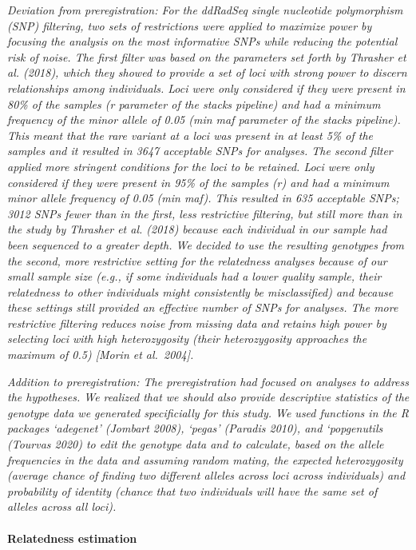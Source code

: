 \documentclass[]{article}
\let\oldparagraph\paragraph
\renewcommand{\paragraph}[1]{\oldparagraph{#1}\mbox{}}
\begin{document}
\emph{Deviation from preregistration: For the ddRadSeq single nucleotide
polymorphism (SNP) filtering, two sets of restrictions were applied to
maximize power by focusing the analysis on the most informative SNPs
while reducing the potential risk of noise. The first filter was based
on the parameters set forth by Thrasher et al. (2018), which they showed
to provide a set of loci with strong power to discern relationships
among individuals. Loci were only considered if they were present in
80\% of the samples (r parameter of the stacks pipeline) and had a
minimum frequency of the minor allele of 0.05 (min maf parameter of the
stacks pipeline). This meant that the rare variant at a loci was present
in at least 5\% of the samples and it resulted in 3647 acceptable SNPs
for analyses. The second filter applied more stringent conditions for
the loci to be retained. Loci were only considered if they were present
in 95\% of the samples (r) and had a minimum minor allele frequency of
0.05 (min maf). This resulted in 635 acceptable SNPs; 3012 SNPs fewer
than in the first, less restrictive filtering, but still more than in
the study by Thrasher et al. (2018) because each individual in our
sample had been sequenced to a greater depth. We decided to use the
resulting genotypes from the second, more restrictive setting for the
relatedness analyses because of our small sample size (e.g., if some
individuals had a lower quality sample, their relatedness to other
individuals might consistently be misclassified) and because these
settings still provided an effective number of SNPs for analyses. The
more restrictive filtering reduces noise from missing data and retains
high power by selecting loci with high heterozygosity (their
heterozygosity approaches the maximum of 0.5) {[}Morin et al.~2004{]}.}

\emph{Addition to preregistration: The preregistration had focused on
analyses to address the hypotheses. We realized that we should also
provide descriptive statistics of the genotype data we generated
specificially for this study. We used functions in the R packages
`adegenet' (Jombart 2008), `pegas' (Paradis 2010), and `popgenutils
(Tourvas 2020) to edit the genotype data and to calculate, based on the
allele frequencies in the data and assuming random mating, the expected
heterozygosity (average chance of finding two different alleles across
loci across individuals) and probability of identity (chance that two
individuals will have the same set of alleles across all loci).}

\hypertarget{relatedness-estimation}{%
\paragraph{Relatedness estimation}\label{relatedness-estimation}}
\end{document}
